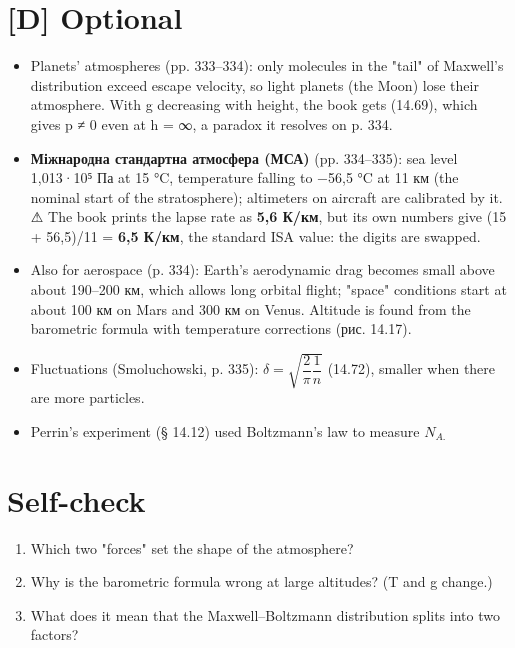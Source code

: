 \documentclass[11pt,a4paper,oneside]{book}
\newcommand{\warn}{{\sffamily\color{warncol}⚠}}
\begin{document}
\section*{[D] Optional}
\begin{itemize}
\item Planets' atmospheres (pp. 333–334): only molecules in the "tail" of Maxwell's distribution exceed escape velocity, so light planets (the Moon) lose their atmosphere. With g decreasing with height, the book gets (14.69), which gives p ≠ 0 even at h = ∞, a paradox it resolves on p. 334.
\item \textbf{Міжнародна стандартна атмосфера (МСА)} (pp. 334–335): sea level 1,013·10⁵ Па at 15 °C, temperature falling to −56,5 °C at 11 км (the nominal start of the stratosphere); altimeters on aircraft are calibrated by it. \warn{} The book prints the lapse rate as \textbf{5,6 К/км}, but its own numbers give (15 + 56,5)/11 = \textbf{6,5 К/км}, the standard ISA value: the digits are swapped.
\item Also for aerospace (p. 334): Earth's aerodynamic drag becomes small above about 190–200 км, which allows long orbital flight; "space" conditions start at about 100 км on Mars and 300 км on Venus. Altitude is found from the barometric formula with temperature corrections (рис. 14.17).
\item Fluctuations (Smoluchowski, p. 335): $\delta = \sqrt{\dfrac2\pi\dfrac1n}$ (14.72), smaller when there are more particles.
\item Perrin's experiment (§ 14.12) used Boltzmann's law to measure $N_{A.}$
\end{itemize}

\section*{Self-check}
\begin{enumerate}
\item Which two "forces" set the shape of the atmosphere?
\item Why is the barometric formula wrong at large altitudes? (T and g change.)
\item What does it mean that the Maxwell–Boltzmann distribution splits into two factors?
\end{enumerate}
\end{document}
